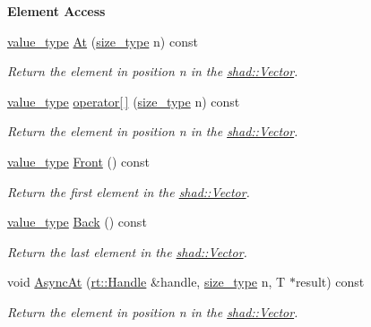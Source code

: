 \begin{Indent}{\bf Element Access}\par
\begin{DoxyCompactItemize}
\item 
\hyperlink{classshad_1_1Vector_adb97b89826617473f44b4bb1dd3308ba}{value\-\_\-type} \hyperlink{classshad_1_1Vector_a5041f2722edbd22fd0bf6d280a78fb2a}{At} (\hyperlink{classshad_1_1Vector_a1c97f4eb87d738cb4de97e5b3587c397}{size\-\_\-type} n) const 
\begin{DoxyCompactList}\small\item\em Return the element in position n in the \hyperlink{classshad_1_1Vector}{shad\-::\-Vector}. \end{DoxyCompactList}\item 
\hyperlink{classshad_1_1Vector_adb97b89826617473f44b4bb1dd3308ba}{value\-\_\-type} \hyperlink{classshad_1_1Vector_a4d81f325dffc7fdcb4af51987fcae5df}{operator\mbox{[}$\,$\mbox{]}} (\hyperlink{classshad_1_1Vector_a1c97f4eb87d738cb4de97e5b3587c397}{size\-\_\-type} n) const 
\begin{DoxyCompactList}\small\item\em Return the element in position n in the \hyperlink{classshad_1_1Vector}{shad\-::\-Vector}. \end{DoxyCompactList}\item 
\hyperlink{classshad_1_1Vector_adb97b89826617473f44b4bb1dd3308ba}{value\-\_\-type} \hyperlink{classshad_1_1Vector_a7949f34a5f3b8a427868c92680472691}{Front} () const 
\begin{DoxyCompactList}\small\item\em Return the first element in the \hyperlink{classshad_1_1Vector}{shad\-::\-Vector}. \end{DoxyCompactList}\item 
\hyperlink{classshad_1_1Vector_adb97b89826617473f44b4bb1dd3308ba}{value\-\_\-type} \hyperlink{classshad_1_1Vector_aa53cd964ab723eba0af88dbba630529b}{Back} () const 
\begin{DoxyCompactList}\small\item\em Return the last element in the \hyperlink{classshad_1_1Vector}{shad\-::\-Vector}. \end{DoxyCompactList}\item 
void \hyperlink{classshad_1_1Vector_a4ccea09ed6061842e203a128b1d15d38}{Async\-At} (\hyperlink{classshad_1_1rt_1_1Handle}{rt\-::\-Handle} \&handle, \hyperlink{classshad_1_1Vector_a1c97f4eb87d738cb4de97e5b3587c397}{size\-\_\-type} n, T $\ast$result) const 
\begin{DoxyCompactList}\small\item\em Return the element in position n in the \hyperlink{classshad_1_1Vector}{shad\-::\-Vector}. \end{DoxyCompactList}\end{DoxyCompactItemize}
\end{Indent}
